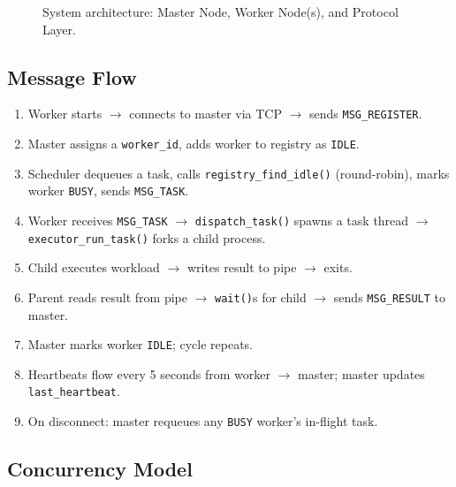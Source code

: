 \documentclass[12pt,a4paper]{article}
\begin{document}
\begin{figure}[H]
\caption{System architecture: Master Node, Worker Node(s), and Protocol Layer.}
\end{figure}

\subsection{Message Flow}

\begin{enumerate}[leftmargin=*]
    \item Worker starts $\rightarrow$ connects to master via TCP $\rightarrow$ sends \texttt{MSG\_REGISTER}.
    \item Master assigns a \texttt{worker\_id}, adds worker to registry as \texttt{IDLE}.
    \item Scheduler dequeues a task, calls \texttt{registry\_find\_idle()} (round-robin), marks worker \texttt{BUSY}, sends \texttt{MSG\_TASK}.
    \item Worker receives \texttt{MSG\_TASK} $\rightarrow$ \texttt{dispatch\_task()} spawns a task thread $\rightarrow$ \texttt{executor\_run\_task()} forks a child process.
    \item Child executes workload $\rightarrow$ writes result to pipe $\rightarrow$ exits.
    \item Parent reads result from pipe $\rightarrow$ \texttt{wait()}s for child $\rightarrow$ sends \texttt{MSG\_RESULT} to master.
    \item Master marks worker \texttt{IDLE}; cycle repeats.
    \item Heartbeats flow every 5 seconds from worker $\rightarrow$ master; master updates \texttt{last\_heartbeat}.
    \item On disconnect: master requeues any \texttt{BUSY} worker's in-flight task.
\end{enumerate}

\subsection{Concurrency Model}
\end{document}
